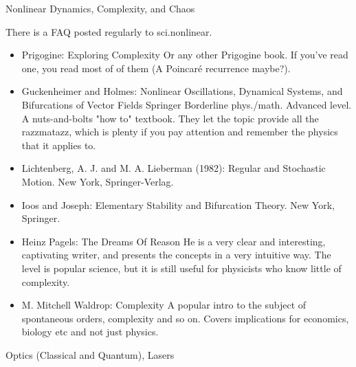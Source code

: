 \documentclass[10pt,a4paper]{book}
\theoremstyle{definition}
\begin{document}
Nonlinear Dynamics, Complexity, and Chaos

There is a FAQ posted regularly to sci.nonlinear.
\begin{itemize}
\item Prigogine: Exploring Complexity
Or any other Prigogine book.  If you've read one, you read most of of them (A Poincaré recurrence maybe?).
\item Guckenheimer and Holmes: Nonlinear Oscillations, Dynamical Systems, and Bifurcations of Vector Fields Springer
Borderline phys./math.  Advanced level.  A nuts-and-bolts "how to" textbook.  They let the topic provide all the razzmatazz, which is plenty if you pay attention and remember the physics that it applies to.
\item Lichtenberg, A. J. and M. A. Lieberman (1982): Regular and Stochastic Motion.  New York, Springer-Verlag.
\item Ioos and Joseph: Elementary Stability and Bifurcation Theory.  New York, Springer.
\item Heinz Pagels: The Dreams Of Reason
He is a very clear and interesting, captivating writer, and presents the concepts in a very intuitive way.  The level is popular science, but it is still useful for physicists who know little of complexity.
\item M. Mitchell Waldrop: Complexity
A popular intro to the subject of spontaneous orders, complexity and so on.  Covers implications for economics, biology etc and not just physics.
\end{itemize}


Optics (Classical and Quantum), Lasers
\end{document}
